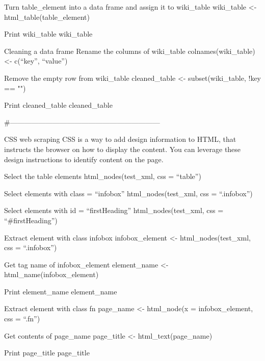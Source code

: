 \documentclass[]{book}
\begin{document}
Turn table\_element into a data frame and assign it to wiki\_table
wiki\_table \textless{}- html\_table(table\_element)

Print wiki\_table
wiki\_table

Cleaning a data frame
Rename the columns of wiki\_table
colnames(wiki\_table) \textless{}- c(``key'', ``value'')

Remove the empty row from wiki\_table
cleaned\_table \textless{}- subset(wiki\_table, !key == "")

Print cleaned\_table
cleaned\_table

\#---------------------------------------------------------------

CSS web scraping
CSS is a way to add design information to HTML, that instructs the browser on how to display the content.
You can leverage these design instructions to identify content on the page.

Select the table elements
html\_nodes(test\_xml, css = ``table'')

Select elements with class = ``infobox''
html\_nodes(test\_xml, css = ``.infobox'')

Select elements with id = ``firstHeading''
html\_nodes(test\_xml, css = ``\#firstHeading'')

Extract element with class infobox
infobox\_element \textless{}- html\_nodes(test\_xml, css = ``.infobox'')

Get tag name of infobox\_element
element\_name \textless{}- html\_name(infobox\_element)

Print element\_name
element\_name

Extract element with class fn
page\_name \textless{}- html\_node(x = infobox\_element, css = ``.fn'')

Get contents of page\_name
page\_title \textless{}- html\_text(page\_name)

Print page\_title
page\_title
\end{document}
